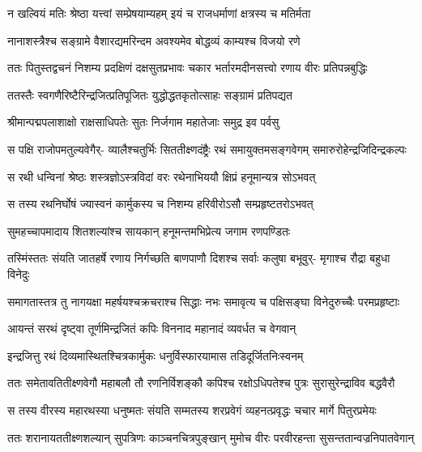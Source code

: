 \twolineshloka
{न खल्वियं मतिः श्रेष्ठा यत्त्वां सम्प्रेषयाम्यहम्}
{इयं च राजधर्माणां क्षत्रस्य च मतिर्मता} %

\twolineshloka
{नानाशस्त्रैश्च सङ्ग्रामे वैशारद्यमरिन्दम}
{अवश्यमेव बोद्धव्यं काम्यश्च विजयो रणे} %

\fourlineindentedshloka
{ततः पितुस्तद्वचनं निशम्य}
{प्रदक्षिणं दक्षसुतप्रभावः}
{चकार भर्तारमदीनसत्त्वो}
{रणाय वीरः प्रतिपन्नबुद्धिः} %

\twolineshloka
{ततस्तैः स्वगणैरिष्टैरिन्द्रजित्प्रतिपूजितः}
{युद्धोद्धतकृतोत्साहः सङ्ग्रामं प्रतिपद्यत} %

\twolineshloka
{श्रीमान्पद्मपलाशाक्षो राक्षसाधिपतेः सुतः}
{निर्जगाम महातेजाः समुद्र इव पर्वसु} %

\fourlineindentedshloka
{स पक्षि राजोपमतुल्यवेगैर्-}
{व्यालैश्चतुर्भिः सिततीक्ष्णदंष्ट्रैः}
{रथं समायुक्तमसङ्गवेगम्}
{समारुरोहेन्द्रजिदिन्द्रकल्पः} %

\twolineshloka
{स रथी धन्विनां श्रेष्ठः शस्त्रज्ञोऽस्त्रविदां वरः}
{रथेनाभिययौ क्षिप्रं हनूमान्यत्र सोऽभवत्} %

\twolineshloka
{स तस्य रथनिर्घोषं ज्यास्वनं कार्मुकस्य च}
{निशम्य हरिवीरोऽसौ सम्प्रहृष्टतरोऽभवत्} %

\twolineshloka
{सुमहच्चापमादाय शितशल्यांश्च सायकान्}
{हनूमन्तमभिप्रेत्य जगाम रणपण्डितः} %

\fourlineindentedshloka
{तस्मिंस्ततः संयति जातहर्षे}
{रणाय निर्गच्छति बाणपाणौ}
{दिशश्च सर्वाः कलुषा बभूवुर्-}
{मृगाश्च रौद्रा बहुधा विनेदुः} %

\fourlineindentedshloka
{समागतास्तत्र तु नागयक्षा}
{महर्षयश्चक्रचराश्च सिद्धाः}
{नभः समावृत्य च पक्षिसङ्घा}
{विनेदुरुच्चैः परमप्रहृष्टाः} %

\twolineshloka
{आयन्तं सरथं दृष्ट्वा तूर्णमिन्द्रजितं कपिः}
{विननाद महानादं व्यवर्धत च वेगवान्} %

\twolineshloka
{इन्द्रजित्तु रथं दिव्यमास्थितश्चित्रकार्मुकः}
{धनुर्विस्फारयामास तडिदूर्जितनिःस्वनम्} %

\fourlineindentedshloka
{ततः समेतावतितीक्ष्णवेगौ}
{महाबलौ तौ रणनिर्विशङ्कौ}
{कपिश्च रक्षोऽधिपतेश्च पुत्रः}
{सुरासुरेन्द्राविव बद्धवैरौ} %

\fourlineindentedshloka
{स तस्य वीरस्य महारथस्या}
{धनुष्मतः संयति सम्मतस्य}
{शरप्रवेगं व्यहनत्प्रवृद्धः}
{चचार मार्गे पितुरप्रमेयः} %

\fourlineindentedshloka
{ततः शरानायततीक्ष्णशल्यान्}
{सुपत्रिणः काञ्चनचित्रपुङ्खान्}
{मुमोच वीरः परवीरहन्ता}
{सुसन्ततान्वज्रनिपातवेगान्} %

